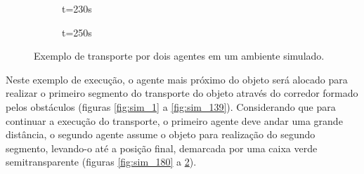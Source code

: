 \begin{figure}[ht!]
  \begin{subfigure}[t]{0.45\textwidth}
    \centering
    \caption{t=230s}
    \label{fig:sim_230}
  \end{subfigure}
  \hspace{0.2cm}
  \begin{subfigure}[t]{0.45\textwidth}
    \centering
    \caption{t=250s}
    \label{fig:sim_250}
  \end{subfigure}

  \caption{Exemplo de transporte por dois agentes em um ambiente simulado.}
  \label{fig:sim_ground}

\end{figure}

Neste exemplo de execução, o agente mais próximo do objeto será alocado para realizar o primeiro segmento do transporte do objeto através do corredor formado pelos obstáculos (figuras \ref{fig:sim_1} a \ref{fig:sim_139}).
Considerando que para continuar a execução do transporte, o primeiro agente deve andar uma grande distância, o segundo agente assume o objeto para realização do segundo segmento, levando-o até a posição final, demarcada por uma caixa verde semitransparente (figuras \ref{fig:sim_180} a \ref{fig:sim_250}).

